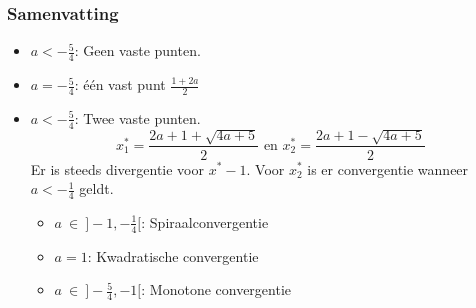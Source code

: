 \documentclass[examenvragen.tex]{subfiles}
\begin{document}
\subsubsection{Samenvatting}
\begin{itemize}
\item $a < -\frac{5}{4}$: Geen vaste punten.
\item $a = -\frac{5}{4}$: \'e\'en vast punt $\frac{1+2a}{2}$
\item $a < -\frac{5}{4}$: Twee vaste punten.
\[
x^{*}_1 = \frac{2a+1 +\sqrt{4a+5}}{2} \text{ en } x^{*}_{2}= \frac{2a+1 -\sqrt{4a+5}}{2}
\]
Er is steeds divergentie voor $x^{*}-1$. 
Voor $x^{*}_{2}$ is er convergentie wanneer $a< -\frac{1}{4}$ geldt.
\begin{itemize}
\item $a \ \in\  ]-1,-\frac{1}{4}[$: Spiraalconvergentie
\item $a=1$: Kwadratische convergentie
\item $a\ \in\ ]-\frac{5}{4},-1[$: Monotone convergentie
\end{itemize} 
\end{itemize}
\end{document}

